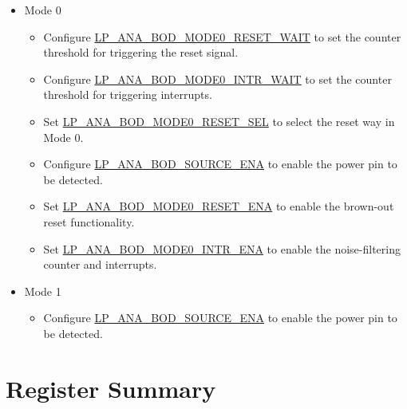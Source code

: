 \documentclass[main\_\_EN.tex]{subfiles}
\begin{document}
\begin{itemize}
    \item Mode 0

    \begin{itemize}
        \item Configure \hyperref[fielddesc:LPANABODMODE0RESETWAIT]{LP\_ANA\_BOD\_MODE0\_RESET\_WAIT} to set the counter threshold for triggering the reset signal.
        \item Configure \hyperref[fielddesc:LPANABODMODE0INTRWAIT]{LP\_ANA\_BOD\_MODE0\_INTR\_WAIT} to set the counter threshold for triggering interrupts.
        \item Set \hyperref[fielddesc:LPANABODMODE0RESETSEL]{LP\_ANA\_BOD\_MODE0\_RESET\_SEL} to select the reset way in Mode 0.
        \item Configure \hyperref[fielddesc:LPANABODSOURCEENA]{LP\_ANA\_BOD\_SOURCE\_ENA} to enable the power pin to be detected.
        \item Set \hyperref[fielddesc:LPANABODMODE0RESETENA]{LP\_ANA\_BOD\_MODE0\_RESET\_ENA} to enable the brown-out reset functionality.
        \item Set \hyperref[fielddesc:LPANABODMODE0INTRENA]{LP\_ANA\_BOD\_MODE0\_INTR\_ENA} to enable the noise-filtering counter and interrupts.
    \end{itemize}

    \item Mode 1

    \begin{itemize}
        \item Configure \hyperref[fielddesc:LPANABODSOURCEENA]{LP\_ANA\_BOD\_SOURCE\_ENA} to enable the power pin to be detected.
    \end{itemize}

\end{itemize}





\newpage
\hypertarget{brownout-reg-summ}{}
\section{Register Summary}
\label{sec:brownout-reg-summ}
\end{document}
